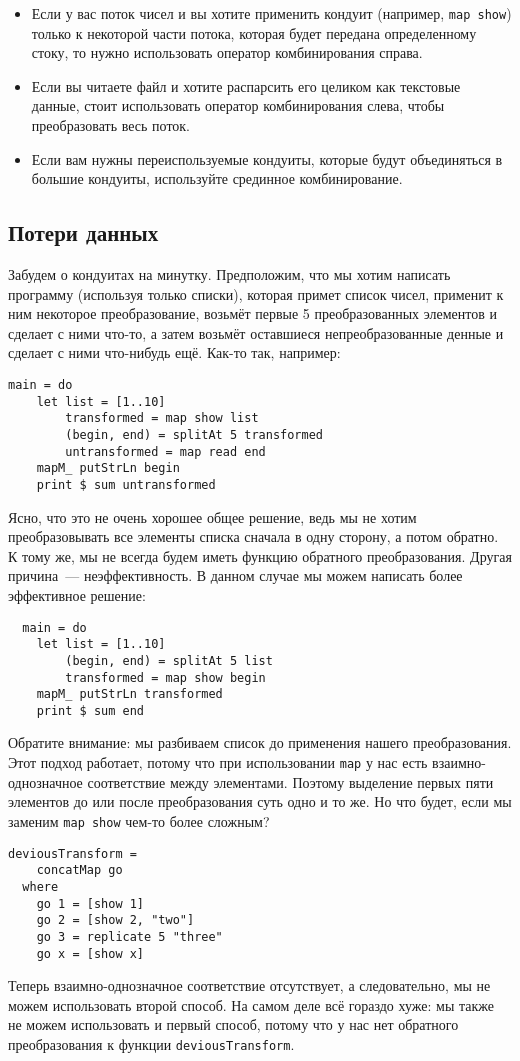 {\begin{itemize}   
\item Если у вас поток чисел и вы хотите применить кондуит (например, 
\lstinline'map show') только к некоторой части потока, которая будет передана 
определенному стоку, то нужно использовать оператор комбинирования справа.
\item Если вы читаете файл и хотите распарсить его целиком как текстовые данные, 
стоит использовать оператор комбинирования слева, чтобы преобразовать весь поток.
\item Если вам нужны переиспользуемые кондуиты, которые будут объединяться в 
большие кондуиты, используйте срединное комбинирование.
\end{itemize}

\subsection{Потери данных} 
Забудем о кондуитах на минутку. Предположим, что мы хотим написать программу (используя 
только списки), которая примет список чисел, применит к ним некоторое преобразование,
возьмёт первые 5 преобразованных элементов и сделает с ними что-то, а затем возьмёт оставшиеся
непреобразованные денные и сделает с ними что-нибудь ещё. Как-то так, например:
\begin{lstlisting}
main = do
    let list = [1..10]
        transformed = map show list
        (begin, end) = splitAt 5 transformed
        untransformed = map read end
    mapM_ putStrLn begin
    print $ sum untransformed
\end{lstlisting}
Ясно, что это не очень хорошее общее решение, ведь мы не хотим
преобразовывать все элементы списка сначала в одну сторону, а потом обратно. К тому же,
мы не всегда будем иметь функцию обратного преобразования. Другая причина~---
неэффективность. В данном случае мы можем написать более эффективное решение:
\begin{lstlisting}
  main = do
    let list = [1..10]
        (begin, end) = splitAt 5 list
        transformed = map show begin
    mapM_ putStrLn transformed
    print $ sum end
\end{lstlisting}
Обратите внимание: мы разбиваем список до применения нашего преобразования. 
Этот подход работает, потому что при использовании \lstinline'map' у нас есть
 взаимно-однозначное соответствие между элементами. Поэтому выделение первых пяти 
 элементов до или после преобразования суть одно и то же. Но что будет, если мы 
 заменим \lstinline'map show' чем-то более сложным?
\begin{lstlisting}
deviousTransform =
    concatMap go
  where
    go 1 = [show 1]
    go 2 = [show 2, "two"]
    go 3 = replicate 5 "three"
    go x = [show x]
\end{lstlisting}
Теперь взаимно-однозначное соответствие отсутствует, а следовательно, мы не можем 
использовать второй способ. На самом деле всё гораздо хуже: мы также не можем 
использовать и первый способ, потому что у нас нет обратного преобразования к 
функции \lstinline'deviousTransform'.
 
}
